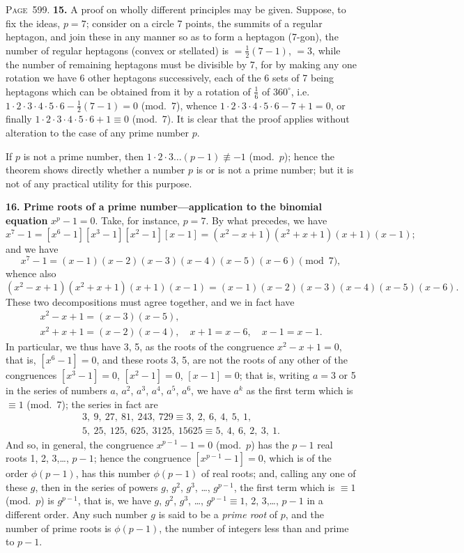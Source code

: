 \documentclass[11pt,a4paper]{book}
\begin{document}
\newpage
\noindent\textsc{Page~599.} \textbf{15.} A proof on wholly different principles may be given. Suppose, to fix the ideas, $p=7$; consider on a circle 7 points, the summits of a regular heptagon, and join these in any manner so as to form a heptagon (7-gon), the number of regular heptagons (convex or stellated) is $=\tfrac12(7-1)$, $=3$, while the number of remaining heptagons must be divisible by 7, for by making any one rotation we have 6 other heptagons successively, each of the 6 sets of 7 being heptagons which can be obtained from it by a rotation of $\tfrac16$ of $360^\circ$, i.e.\ $1\cdot2\cdot3\cdot4\cdot5\cdot6-\tfrac12(7-1)=0$ (mod.\ 7), whence $1\cdot2\cdot3\cdot4\cdot5\cdot6-7+1=0$, or finally $1\cdot2\cdot3\cdot4\cdot5\cdot6+1\equiv0$ (mod.\ 7). It is clear that the proof applies without alteration to the case of any prime number $p$.

If $p$ is not a prime number, then $1\cdot2\cdot3\ldots(p-1)\not\equiv-1$ (mod.\ $p$); hence the theorem shows directly whether a number $p$ is or is not a prime number; but it is not of any practical utility for this purpose.

\textbf{16. Prime roots of a prime number---application to the binomial equation} $x^p-1=0$. Take, for instance, $p=7$. By what precedes, we have
\[
x^7-1=[x^6-1][x^3-1][x^2-1][x-1]=(x^2-x+1)(x^2+x+1)(x+1)(x-1);
\]
and we have
\[
x^7-1=(x-1)(x-2)(x-3)(x-4)(x-5)(x-6)\pmod{7},
\]
whence also
\[
(x^2-x+1)(x^2+x+1)(x+1)(x-1)=(x-1)(x-2)(x-3)(x-4)(x-5)(x-6).
\]
These two decompositions must agree together, and we in fact have
\begin{gather*}
x^2-x+1=(x-3)(x-5),\\
x^2+x+1=(x-2)(x-4),\quad x+1=x-6,\quad x-1=x-1.
\end{gather*}
In particular, we thus have 3, 5, as the roots of the congruence $x^2-x+1=0$, that is, $[x^6-1]=0$, and these roots 3, 5, are not the roots of any other of the congruences $[x^3-1]=0$, $[x^2-1]=0$, $[x-1]=0$; that is, writing $a=3$ or 5 in the series of numbers $a$, $a^2$, $a^3$, $a^4$, $a^5$, $a^6$, we have $a^k$ as the first term which is $\equiv1$ (mod.\ 7); the series in fact are
\begin{gather*}
3,\ 9,\ 27,\ 81,\ 243,\ 729\equiv3,\ 2,\ 6,\ 4,\ 5,\ 1,\\
5,\ 25,\ 125,\ 625,\ 3125,\ 15625\equiv5,\ 4,\ 6,\ 2,\ 3,\ 1.
\end{gather*}
And so, in general, the congruence $x^{p-1}-1=0$ (mod.\ $p$) has the $p-1$ real roots 1, 2, 3,\ldots, $p-1$; hence the congruence $[x^{p-1}-1]=0$, which is of the order $\phi(p-1)$, has this number $\phi(p-1)$ of real roots; and, calling any one of these $g$, then in the series of powers $g$, $g^2$, $g^3$, \ldots, $g^{p-1}$, the first term which is $\equiv1$ (mod.\ $p$) is $g^{p-1}$, that is, we have $g$, $g^2$, $g^3$, \ldots, $g^{p-1}\equiv1$, 2, 3,\ldots, $p-1$ in a different order. Any such number $g$ is said to be a \textit{prime root} of $p$, and the number of prime roots is $\phi(p-1)$, the number of integers less than and prime to $p-1$.
\end{document}
